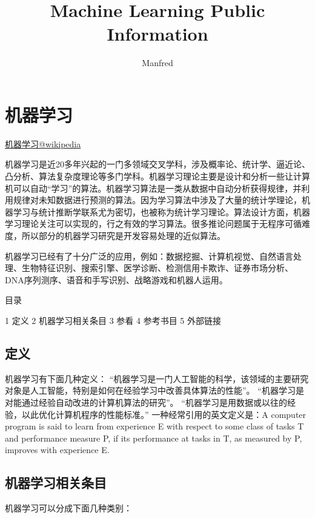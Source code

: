 \documentclass{article}
\author{Manfred}
\title{Machine Learning Public Information}
\begin{document}
\maketitle
\newpage

\tableofcontents
\newpage

\listoftables
\newpage

\listoffigures
\newpage

\section{机器学习}
\href{http://zh.wikipedia.org/wiki/%E6%9C%BA%E5%99%A8%E5%AD%A6%E4%B9%A0}{机器学习@wikipedia}

机器学习是近20多年兴起的一门多领域交叉学科，涉及概率论、统计学、逼近论、凸分析、算法复杂度理论等多门学科。机器学习理论主要是设计和分析一些让计算机可以自动“学习”的算法。机器学习算法是一类从数据中自动分析获得规律，并利用规律对未知数据进行预测的算法。因为学习算法中涉及了大量的统计学理论，机器学习与统计推断学联系尤为密切，也被称为统计学习理论。算法设计方面，机器学习理论关注可以实现的，行之有效的学习算法。很多推论问题属于无程序可循难度，所以部分的机器学习研究是开发容易处理的近似算法。

机器学习已经有了十分广泛的应用，例如：数据挖掘、计算机视觉、自然语言处理、生物特征识别、搜索引擎、医学诊断、检测信用卡欺诈、证券市场分析、DNA序列测序、语音和手写识别、战略游戏和机器人运用。

目录

    1 定义
    2 机器学习相关条目
    3 参看
    4 参考书目
    5 外部链接

\subsection{定义}

机器学习有下面几种定义： “机器学习是一门人工智能的科学，该领域的主要研究对象是人工智能，特别是如何在经验学习中改善具体算法的性能”。 “机器学习是对能通过经验自动改进的计算机算法的研究”。 “机器学习是用数据或以往的经验，以此优化计算机程序的性能标准。” 一种经常引用的英文定义是：A computer program is said to learn from experience E with respect to some class of tasks T and performance measure P, if its performance at tasks in T, as measured by P, improves with experience E.
\subsection{机器学习相关条目}

机器学习可以分成下面几种类别：
\end{document}
